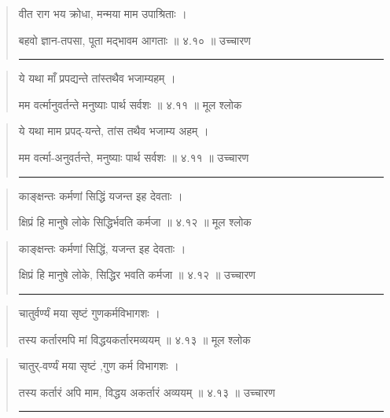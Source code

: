 \begin{quotation}

वीत राग भय क्रोधा, मन्मया माम उपाश्रिताः  ।  

बहवो ज्ञान-तपसा, पूता मद्भावम आगताः  ॥ ४.१० ॥  उच्चारण

\noindent\rule{16cm}{0.4pt} 
\end{quotation}


\begin{quotation}

ये यथा माँ प्रपद्यन्ते तांस्तथैव भजाम्यहम्‌  ।  

मम वर्त्मानुवर्तन्ते मनुष्याः पार्थ सर्वशः  ॥ ४.११ ॥  मूल श्लोक
\end{quotation}

\begin{quotation}

ये यथा माम प्रपद्-यन्ते, तांस तथैव भजाम्य अहम्‌  ।  

मम वर्त्मा-अनुवर्तन्ते, मनुष्याः पार्थ सर्वशः  ॥ ४.११ ॥  उच्चारण

\noindent\rule{16cm}{0.4pt} 
\end{quotation}


\begin{quotation}

काङ्‍क्षन्तः कर्मणां सिद्धिं यजन्त इह देवताः  ।  

क्षिप्रं हि मानुषे लोके सिद्धिर्भवति कर्मजा  ॥ ४.१२ ॥  मूल श्लोक
\end{quotation}

\begin{quotation}

काङ्‍क्षन्तः कर्मणां सिद्धिं, यजन्त इह देवताः  ।  

क्षिप्रं हि मानुषे लोके, सिद्धिर भवति कर्मजा  ॥ ४.१२ ॥  उच्चारण

\noindent\rule{16cm}{0.4pt} 
\end{quotation}


\begin{quotation}

चातुर्वर्ण्यं मया सृष्टं गुणकर्मविभागशः  ।  

तस्य कर्तारमपि मां विद्धयकर्तारमव्ययम्‌  ॥ ४.१३ ॥  मूल श्लोक
\end{quotation}

\begin{quotation}

चातुर्-वर्ण्यं मया सृष्टं ,गुण कर्म विभागशः  ।  

तस्य कर्तारं अपि माम, विद्धय अकर्तारं अव्ययम्‌  ॥ ४.१३ ॥  उच्चारण

\noindent\rule{16cm}{0.4pt} 
\end{quotation}


